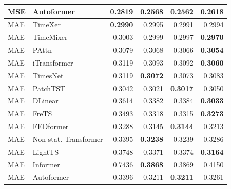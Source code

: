 \begin{longtable}{llrrrr}
MSE & Autoformer & 0.2819 & 0.2568 & \textbf{0.2562} & 0.2618 \\
\midrule
MAE & TimeXer & \textbf{0.2990} & 0.2995 & 0.2991 & 0.2994 \\
MAE & TimeMixer & 0.3003 & 0.2999 & 0.2997 & \textbf{0.2970} \\
MAE & PAttn & 0.3079 & 0.3068 & 0.3066 & \textbf{0.3054} \\
MAE & iTransformer & 0.3119 & 0.3093 & 0.3092 & \textbf{0.3060} \\
MAE & TimesNet & 0.3119 & \textbf{0.3072} & 0.3073 & 0.3083 \\
MAE & PatchTST & 0.3042 & 0.3021 & \textbf{0.3017} & 0.3050 \\
MAE & DLinear & 0.3614 & 0.3382 & 0.3384 & \textbf{0.3033} \\
MAE & FreTS & 0.3493 & 0.3318 & 0.3315 & \textbf{0.3273} \\
MAE & FEDformer & 0.3288 & 0.3145 & \textbf{0.3144} & 0.3213 \\
MAE & Non-stat. Transformer & 0.3395 & \textbf{0.3238} & 0.3239 & 0.3286 \\
MAE & LightTS & 0.3748 & 0.3371 & 0.3374 & \textbf{0.3164} \\
MAE & Informer & 0.7436 & \textbf{0.3868} & 0.3869 & 0.4150 \\
MAE & Autoformer & 0.3396 & 0.3211 & \textbf{0.3211} & 0.3261 \\
\end{longtable}
\endgroup

